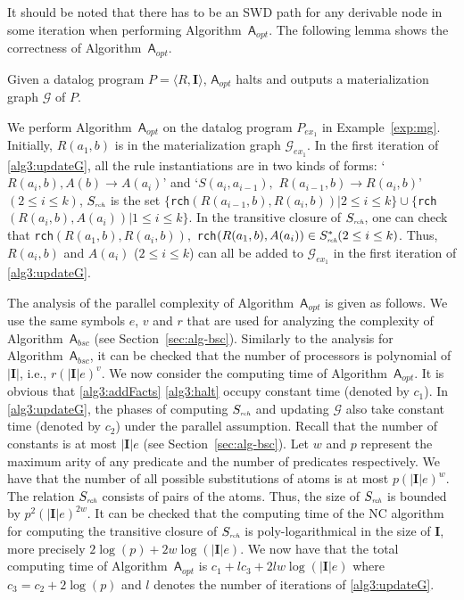\documentclass[final,1p,times]{elsarticle}
\begin{document}
It should be noted that there has to be an SWD path for any derivable node in some iteration when performing
Algorithm~$\mathsf{A}_{opt}$.
The following lemma shows the correctness of Algorithm~$\mathsf{A}_{opt}$.

\begin{lemma}\label{lemma:a3}
Given a datalog program $P=\langle R, \textbf{I}\rangle$,
$\mathsf{A}_{opt}$ halts and outputs a materialization graph $\mathcal{G}$ of $P$.
\end{lemma}

\begin{example}\label{exp:opt}
We perform Algorithm~$\mathsf{A}_{opt}$ on the datalog program $P_{ex_1}$ in Example~\ref{exp:mg}.
Initially, $R(a_1,b)$ is in the materialization graph $\mathcal{G}_{ex_1}$.
In the first iteration of \ref{alg3:updateG}, all the rule instantiations are in two kinds of forms:
`$R(a_i,b),A(b)\rightarrow A(a_i)$' and `$S(a_i,a_{i-1}),$ $R(a_{i-1},b)\rightarrow R(a_i,b)$' $(2\leq i\leq k)$,
$S_{\textit{\tiny rch}}$ is the set $\{$\texttt{rch}$(R(a_{i-1},b), R(a_i,b))|2\leq i\leq k\}
\cup\{$\texttt{rch}$(R(a_i,b), A(a_i))|1\leq i\leq k\}$.
In the transitive closure of $S_{\textit{\tiny rch}}$,
one can check that \texttt{rch}$(R(a_1,b), R(a_i,b)),$
\texttt{rch}$(R(a_1,b), A(a_i))\in S^*_{\textit{\tiny rch}}(2\leq i\leq k)$.
Thus, $R(a_i,b)$ and $A(a_i)$ ($2\leq i\leq k$) can all be added to $\mathcal{G}_{ex_1}$
in the first iteration of \ref{alg3:updateG}.
\end{example}

The analysis of the parallel complexity of Algorithm~$\mathsf{A}_{opt}$ is given as follows.
We use the same symbols $e$, $v$ and $r$ that are used for analyzing the complexity of Algorithm~$\mathsf{A}_{bsc}$
(see Section~\ref{sec:alg-bsc}). Similarly to the analysis for Algorithm~$\mathsf{A}_{bsc}$, it can be checked that 
the number of processors is polynomial of $|\textbf{I}|$, i.e., $r(|\textbf{I}|e)^v$.
We now consider the computing time of Algorithm~$\mathsf{A}_{opt}$. It is obvious that \ref{alg3:addFacts}
\ref{alg3:halt} occupy constant time (denoted by $c_1$). In \ref{alg3:updateG}, the phases of
computing $S_{\textit{\tiny rch}}$ and updating $\mathcal{G}$ also take constant time (denoted by $c_2$)
under the parallel assumption. Recall that the number of constants is at most $|\textbf{I}|e$ (see Section~\ref{sec:alg-bsc}).
Let $w$ and $p$ represent the maximum arity of any predicate and the number of predicates respectively.
We have that the number of all possible substitutions of atoms is at most $p(|\textbf{I}|e)^w$.
The relation $S_{\textit{\tiny rch}}$ consists of pairs of the atoms. Thus, the size of $S_{\textit{\tiny rch}}$
is bounded by $p^2(|\textbf{I}|e)^{2w}$. It can be checked that the computing time of the NC algorithm for computing the transitive
closure of $S_{\textit{\tiny rch}}$ is poly-logarithmical in the size of $\textbf{I}$, more precisely $2\log(p)+2w\log(|\textbf{I}|e)$.
We now have that the total computing time of Algorithm~$\mathsf{A}_{opt}$ is $c_1+lc_3+2lw\log(|\textbf{I}|e)$
where $c_3=c_2+2\log(p)$ and $l$ denotes the number of iterations of \ref{alg3:updateG}.
\end{document}

